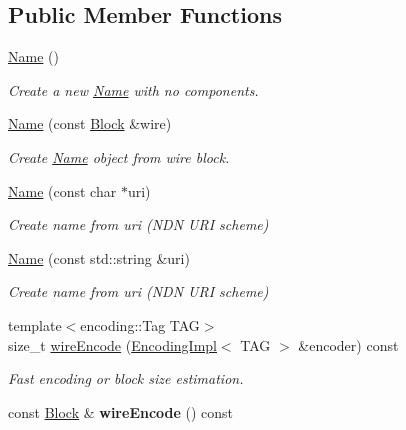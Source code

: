 \subsection*{Public Member Functions}
\begin{DoxyCompactItemize}
\item 
\hyperlink{classndn_1_1Name_a94700aa342c14f62f925bd93f864998a}{Name} ()\hypertarget{classndn_1_1Name_a94700aa342c14f62f925bd93f864998a}{}\label{classndn_1_1Name_a94700aa342c14f62f925bd93f864998a}

\begin{DoxyCompactList}\small\item\em Create a new \hyperlink{classndn_1_1Name}{Name} with no components. \end{DoxyCompactList}\item 
\hyperlink{classndn_1_1Name_a9f7eca62194d3ac1634aad9c582a416e}{Name} (const \hyperlink{classndn_1_1Block}{Block} \&wire)
\begin{DoxyCompactList}\small\item\em Create \hyperlink{classndn_1_1Name}{Name} object from wire block. \end{DoxyCompactList}\item 
\hyperlink{classndn_1_1Name_a87954075c46c6cc2b5a43e9f046482ce}{Name} (const char $\ast$uri)
\begin{DoxyCompactList}\small\item\em Create name from {\ttfamily uri} (N\+DN U\+RI scheme) \end{DoxyCompactList}\item 
\hyperlink{classndn_1_1Name_a13414a5708f7b6d5f60faef2472647fc}{Name} (const std\+::string \&uri)
\begin{DoxyCompactList}\small\item\em Create name from {\ttfamily uri} (N\+DN U\+RI scheme) \end{DoxyCompactList}\item 
{\footnotesize template$<$encoding\+::\+Tag T\+AG$>$ }\\size\+\_\+t \hyperlink{classndn_1_1Name_aade9569b160634ccc8032014c53ab3f9}{wire\+Encode} (\hyperlink{classndn_1_1encoding_1_1EncodingImpl}{Encoding\+Impl}$<$ T\+AG $>$ \&encoder) const\hypertarget{classndn_1_1Name_aade9569b160634ccc8032014c53ab3f9}{}\label{classndn_1_1Name_aade9569b160634ccc8032014c53ab3f9}

\begin{DoxyCompactList}\small\item\em Fast encoding or block size estimation. \end{DoxyCompactList}\item 
const \hyperlink{classndn_1_1Block}{Block} \& {\bfseries wire\+Encode} () const\hypertarget{classndn_1_1Name_ab3950711642d48905b8fae231af92737}{}\label{classndn_1_1Name_ab3950711642d48905b8fae231af92737}


\end{DoxyCompactItemize}
